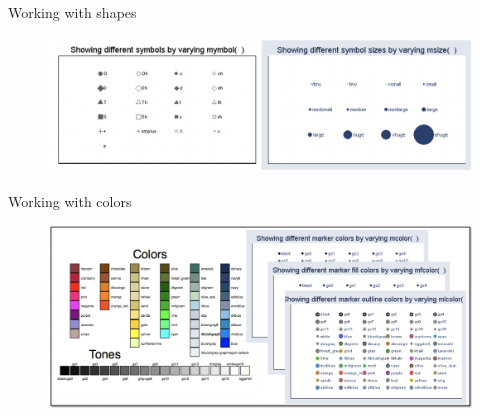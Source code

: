 \documentclass[aspectratio=169]{beamer}
\begin{document}
\begin{frame}{Working with shapes}
	
	\begin{figure}
		\centering
		\includegraphics[width=\linewidth]{img/Shapes}
	\end{figure}
	
\end{frame}


\begin{frame}{Working with colors}
	
	\begin{figure}
		\centering
		\includegraphics[width=\linewidth]{img/Colors}
	\end{figure}
	
\end{frame}
\end{document}
